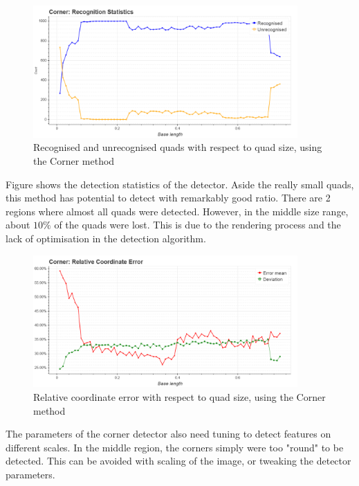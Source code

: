\begin{figure}[ht]
	\centering
	\includegraphics[width=0.9\textwidth]{figures/plots/corner_rec_unrec_count.png}
	\caption{Recognised and unrecognised quads with respect to quad size, using the Corner method}
	\label{fig:cornerRecCnt}
\end{figure}
Figure  shows the detection statistics of the detector.
Aside the really small quads, this method has potential to detect with remarkably good ratio.
There are 2 regions where almost all quads were detected.
However, in the middle size range, about $10\%$ of the quads were lost.
This is due to the rendering process and the lack of optimisation in the detection algorithm.
\begin{figure}[ht]
	\centering
	\includegraphics[width=0.9\textwidth]{figures/plots/corner_relative_coordinate_error.png}
	\caption{Relative coordinate error with respect to quad size, using the Corner method}
	\label{fig:cornerRelCoordErr}
\end{figure}
The parameters of the corner detector also need tuning to detect features on different scales.
In the middle region, the corners simply were too "round" to be detected.
This can be avoided with scaling of the image, or tweaking the detector parameters.

